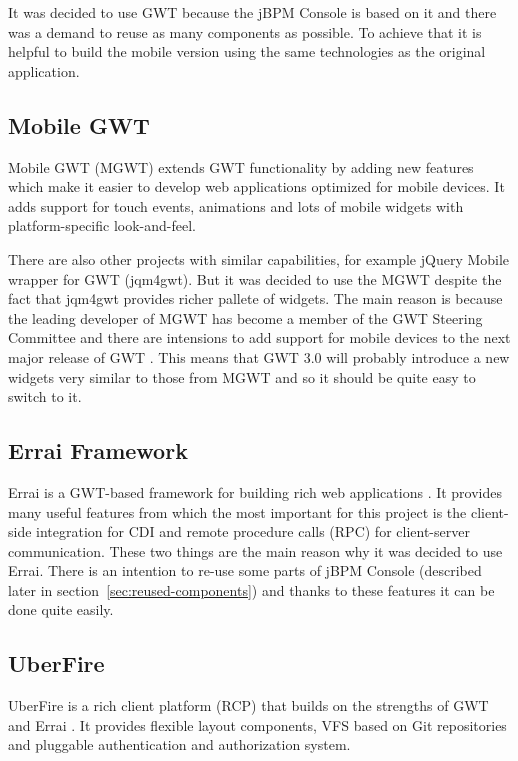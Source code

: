 \documentclass[12pt,oneside,final]{fithesis2}
\begin{document}
It was decided to use GWT because the jBPM Console is based on it and there was a demand to reuse as many components as possible.
To achieve that it is helpful to build the mobile version using the same technologies as the original application.

\subsection{Mobile GWT}
Mobile GWT (MGWT) extends GWT functionality by adding new features which make it easier to develop web applications optimized for mobile devices.
It adds support for touch events, animations and lots of mobile widgets with platform-specific look-and-feel.

There are also other projects with similar capabilities, for example jQuery Mobile wrapper for GWT\footnotemark{} (jqm4gwt).
But it was decided to use the MGWT despite the fact that jqm4gwt provides richer pallete of widgets.
The main reason is because the leading developer of MGWT has become a member of the GWT Steering Committee and there are intensions to add support for mobile devices to the next major release of GWT \cite{gwtroadmap}.
This means that GWT 3.0 will probably introduce a new widgets very similar to those from MGWT and so it should be quite easy to switch to it.

\subsection{Errai Framework}
Errai is a GWT-based framework for building rich web applications \cite{erraidoc}.
It provides many useful features from which the most important for this project is the client-side integration for CDI\footnotemark{} and remote procedure calls (RPC) for client-server communication.
These two things are the main reason why it was decided to use Errai.
There is an intention to re-use some parts of jBPM Console (described later in section~\ref{sec:reused-components}) and thanks to these features it can be done quite easily.

\subsection{UberFire}
UberFire is a rich client platform (RCP) that builds on the strengths of GWT and Errai \cite{uberfire}.
It provides flexible layout components, VFS based on Git repositories and pluggable authentication and authorization system.
\end{document}

